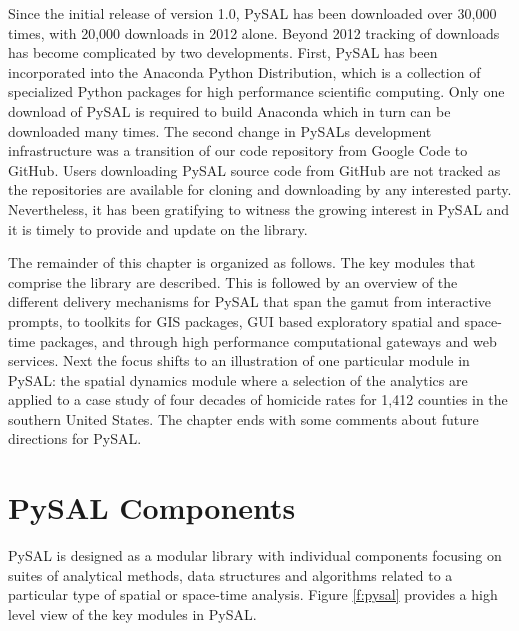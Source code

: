 \documentclass[11pt, titlepage]{article}
\begin{document}
Since the initial release of version 1.0, PySAL has been downloaded over 30,000
times, with 20,000 downloads in 2012 alone. Beyond 2012 tracking of
downloads has become complicated by two developments. First, PySAL has
been incorporated into the Anaconda Python Distribution, which is a
collection of specialized Python packages for high performance
scientific computing. Only one download of PySAL is required to build
Anaconda which in turn can be downloaded many times. The second change
in PySALs development infrastructure was a transition of our code
repository from Google Code to GitHub. Users downloading PySAL source
code from GitHub are not tracked as the repositories are available for
cloning and downloading by any interested party. Nevertheless, it has
been gratifying to witness the growing interest in PySAL and it is
timely to provide and update on the library.

The remainder of this chapter is organized as follows. The key modules
that comprise the library are described. This is followed by an overview
of the different delivery mechanisms for PySAL that span the gamut from
interactive prompts, to toolkits for GIS packages, GUI based exploratory
spatial and space-time packages, and through high performance
computational gateways and web services. Next the focus shifts to an
illustration of one particular module in PySAL: the spatial dynamics
module where a selection of the analytics are applied to a case study of
four decades of homicide rates for 1,412 counties in the southern United
States. The chapter ends with some comments about future directions for PySAL.

\section{PySAL Components}

PySAL is designed as a modular library with individual components
focusing on suites of analytical methods, data structures and algorithms
related to a particular type of spatial or space-time analysis. Figure
\ref{f:pysal} provides a high level view of the key modules in PySAL.
\end{document}
